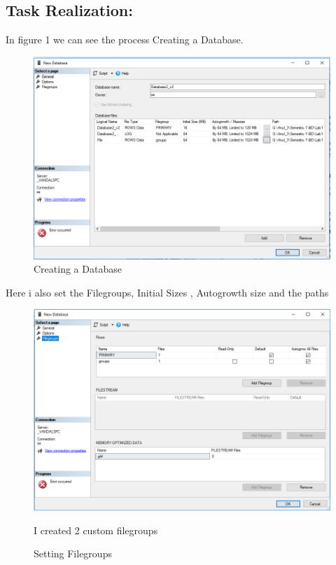 \documentclass[12pt]{article}
\begin{document}
\begin{itemize}
                
                \end{itemize}
        \subsection*{Task Realization:}
        In figure 1 we can see the process Creating a Database. 
        
        \begin{figure}[H]
                \centering
                \includegraphics[width=.95\textwidth]{img1.png}
                \caption{ Creating a Database}
        \end{figure}
        \vspace{0.5 cm}
        Here i also set the Filegroups, Initial Sizes , Autogrowth size and the paths
        
        \begin{figure}[H]
                \centering
                \includegraphics[width=.95\textwidth]{img2.png}
                \caption{Setting  Filegroups }
                I created 2 custom filegroups
        \end{figure}
        \vspace{0.5 cm}
\end{document}
